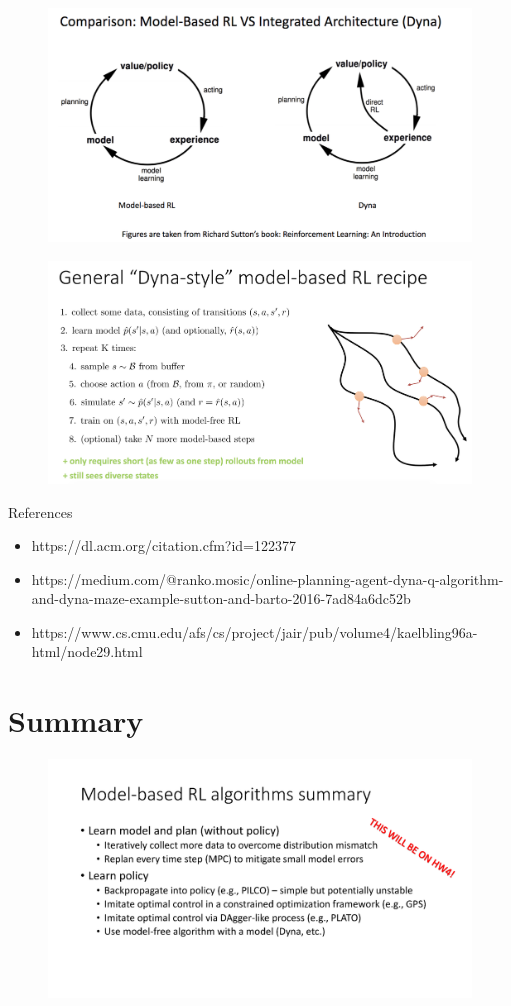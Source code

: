 \documentclass{article}
\begin{document}
\begin{figure}[H]
    \centering
        \includegraphics[width=0.8\linewidth]{img/Dyna_comparison.png}
\end{figure}

\begin{figure}[H]
    \centering
        \includegraphics[width=0.8\linewidth]{img/general_Dyna.png}
\end{figure}

References
\begin{itemize}
	\item https://dl.acm.org/citation.cfm?id=122377
	\item https://medium.com/@ranko.mosic/online-planning-agent-dyna-q-algorithm-and-dyna-maze-example-sutton-and-barto-2016-7ad84a6dc52b
	\item https://www.cs.cmu.edu/afs/cs/project/jair/pub/volume4/kaelbling96a-html/node29.html
\end{itemize}

\section{Summary}
\begin{figure}[H]
    \centering
        \includegraphics[width=0.8\linewidth]{img/model-based.png}
\end{figure}
\end{document}
